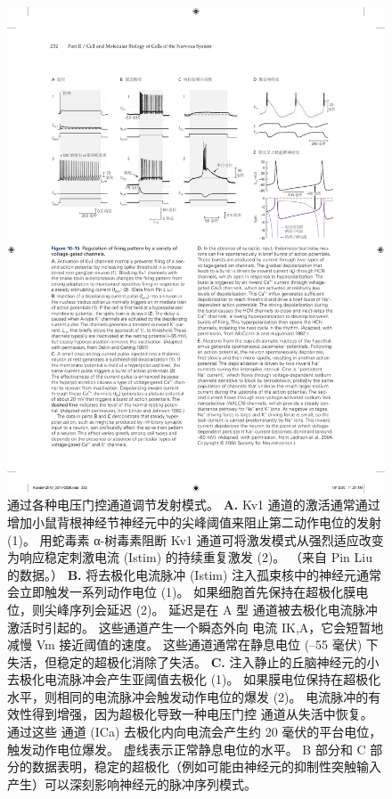 \begin{figure}[htbp]
	\centering
	\includegraphics[width=0.85\linewidth]{chap10/fig_10_15}
	\caption{通过各种电压门控通道调节发射模式。
		\textbf{A.} Kv1 通道的激活通常通过增加小鼠背根神经节神经元中的尖峰阈值来阻止第二动作电位的发射 (1)。
		用蛇毒素 α-树毒素阻断 Kv1 通道可将激发模式从强烈适应改变为响应稳定刺激电流 (Istim) 的持续重复激发 (2)。 
		（来自 Pin Liu 的数据。）
		\textbf{B.} 将去极化电流脉冲 (Istim) 注入孤束核中的神经元通常会立即触发一系列动作电位 (1)。
		如果细胞首先保持在超极化膜电位，则尖峰序列会延迟 (2)。
		延迟是在 A 型  通道被去极化电流脉冲激活时引起的。
		这些通道产生一个瞬态外向  电流 IK,A，它会短暂地减慢 Vm 接近阈值的速度。
		这些通道通常在静息电位 (–55 毫伏) 下失活，但稳定的超极化消除了失活\cite{dekin1987vitro}。
		\textbf{C.} 注入静止的丘脑神经元的小去极化电流脉冲会产生亚阈值去极化 (1)。
		如果膜电位保持在超极化水平，则相同的电流脉冲会触发动作电位的爆发 (2)。
		电流脉冲的有效性得到增强，因为超极化导致一种电压门控  通道从失活中恢复。
		通过这些  通道 (ICa) 去极化内向电流会产生约 20 毫伏的平台电位，触发动作电位爆发。
		虚线表示正常静息电位的水平\cite{llinas1982electrophysiology}。
		B 部分和 C 部分的数据表明，稳定的超极化（例如可能由神经元的抑制性突触输入产生）可以深刻影响神经元的脉冲序列模式。
}
\end{figure}
